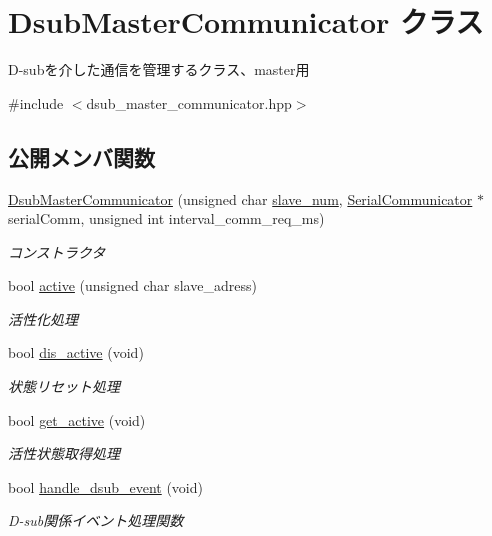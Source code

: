 \hypertarget{class_dsub_master_communicator}{}\section{Dsub\+Master\+Communicator クラス}
\label{class_dsub_master_communicator}


D-\/subを介した通信を管理するクラス、master用  




{\ttfamily \#include $<$dsub\+\_\+master\+\_\+communicator.\+hpp$>$}

\subsection*{公開メンバ関数}
\begin{DoxyCompactItemize}
\item 
\mbox{\hyperlink{class_dsub_master_communicator_af0d5f28218bbcfc0f93f195a0c6c3df6}{Dsub\+Master\+Communicator}} (unsigned char \mbox{\hyperlink{start__module_8ino_a74d30eb4a8cad665a32a15dbee48837f}{slave\+\_\+num}}, \mbox{\hyperlink{class_serial_communicator}{Serial\+Communicator}} $\ast$serial\+Comm, unsigned int interval\+\_\+comm\+\_\+req\+\_\+ms)
\begin{DoxyCompactList}\small\item\em コンストラクタ \end{DoxyCompactList}\item 
bool \mbox{\hyperlink{class_dsub_master_communicator_af8b31c088520cc95c05df13be86627f8}{active}} (unsigned char slave\+\_\+adress)
\begin{DoxyCompactList}\small\item\em 活性化処理 \end{DoxyCompactList}\item 
bool \mbox{\hyperlink{class_dsub_master_communicator_ac0a9298c691adbdf844f85d680d7e554}{dis\+\_\+active}} (void)
\begin{DoxyCompactList}\small\item\em 状態リセット処理 \end{DoxyCompactList}\item 
bool \mbox{\hyperlink{class_dsub_master_communicator_a81a0576ab39cc508c879336038c4fd4a}{get\+\_\+active}} (void)
\begin{DoxyCompactList}\small\item\em 活性状態取得処理 \end{DoxyCompactList}\item 
bool \mbox{\hyperlink{class_dsub_master_communicator_a91a5a356d0aa58a30f3381522cd7616f}{handle\+\_\+dsub\+\_\+event}} (void)
\begin{DoxyCompactList}\small\item\em D-\/sub関係イベント処理関数 \end{DoxyCompactList}\end{DoxyCompactItemize}


